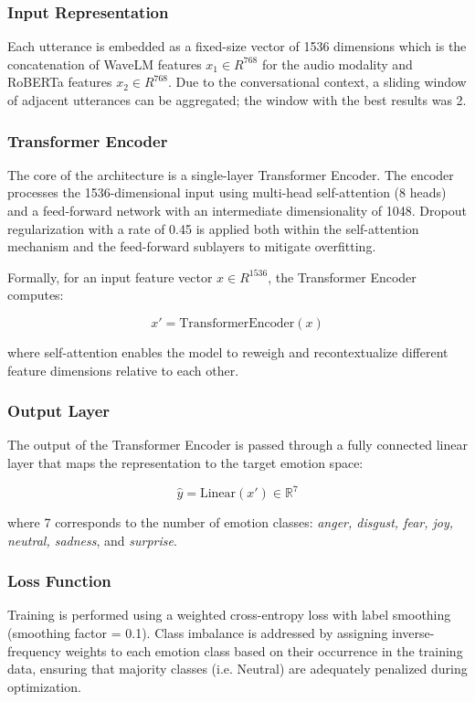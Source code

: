 \documentclass{article}
\begin{document}
\subsubsection{Input Representation}
Each utterance is embedded as a fixed-size vector of 1536 dimensions which is the concatenation of WaveLM features $x_1 \in R^{768}$ for the audio modality and RoBERTa features $x_2 \in R^{768}$. Due to the conversational context, a sliding window of adjacent utterances can be aggregated; the window with the best results was 2.

\subsubsection{Transformer Encoder}
The core of the architecture is a single-layer Transformer Encoder. The encoder processes the 1536-dimensional input using multi-head self-attention (8 heads) and a feed-forward network with an intermediate dimensionality of 1048. Dropout regularization with a rate of 0.45 is applied both within the self-attention mechanism and the feed-forward sublayers to mitigate overfitting.

Formally, for an input feature vector $ x \in {R}^{1536} $, the Transformer Encoder computes:

$$ x' = \text{TransformerEncoder}(x) $$

where self-attention enables the model to reweigh and recontextualize different feature dimensions relative to each other.

\subsubsection{Output Layer}
The output of the Transformer Encoder is passed through a fully connected linear layer that maps the representation to the target emotion space:

$$\hat{y} = \text{Linear}(x') \in \mathbb{R}^{7}$$

where 7 corresponds to the number of emotion classes: \textit{anger, disgust, fear, joy, neutral, sadness}, and \textit{surprise}.

\subsubsection{Loss Function}
Training is performed using a weighted cross-entropy loss with label smoothing (smoothing factor = 0.1). Class imbalance is addressed by assigning inverse-frequency weights to each emotion class based on their occurrence in the training data, ensuring that majority classes (i.e. Neutral) are adequately penalized during optimization.
\end{document}
